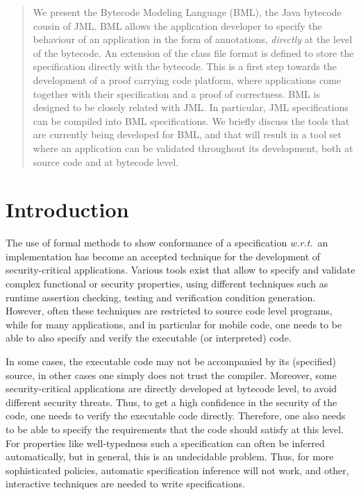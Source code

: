 \begin{abstract} 

We present the Bytecode Modeling Language (BML), the Java bytecode
cousin of JML. BML allows the application developer to specify the
behaviour of an application in the form of annotations,
\emph{directly} at the level of the bytecode. An extension of the class file
format is defined to store the specification directly with the
bytecode. This is a first step towards the development of a proof
carrying code platform, where applications come together with their
specification and a proof of correctness. BML is designed to be
closely related with JML. In particular, JML specifications can be
compiled into BML specifications. We briefly discuss the tools that
are currently being developed for BML, and that will result in a tool
set where an application can be validated throughout its development,
both at source code and at bytecode level.

\end{abstract}

\section{Introduction}\label{IntroSectLab}

The use of formal methods to show conformance of a specification
\emph{w.r.t.}\ an implementation has become an accepted technique 
for the development of security-critical applications. Various tools
exist that allow to specify and validate complex functional or
security properties, using different techniques such as runtime
assertion checking, testing and verification condition generation.
However, often these techniques are restricted to source code level
programs, while for many applications, and in particular for mobile
code, one needs to be able to also specify and verify the executable
(or interpreted) code.


In some cases, the executable code may not be accompanied by its
(specified) source, in other cases one simply does not trust the
compiler. Moreover, some security-critical applications are directly
developed at bytecode level, to avoid different security
threats. Thus, to get a high confidence in the security of the code,
one needs to verify the executable code directly. Therefore, one also
needs to be able to specify the requirements that the code should
satisfy at this level. For properties like well-typedness such a
specification can often be inferred automatically, but in general,
this is an undecidable problem. Thus, for more sophisticated policies,
automatic specification inference will not work, and other,
interactive techniques are needed to write specifications.

